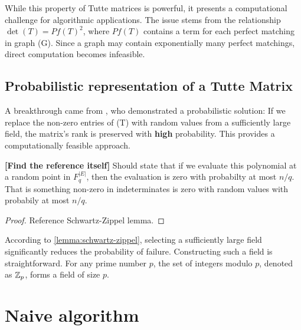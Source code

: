 While this property of Tutte matrices is powerful, it presents a computational challenge for algorithmic applications. 
The issue stems from the relationship \(\det(T) = Pf(T)^2\), where \(Pf(T)\) contains a term for each perfect matching in graph (G). 
Since a graph may contain exponentially many perfect matchings, direct computation becomes infeasible.

\subsection{Probabilistic representation of a Tutte Matrix}
A breakthrough came from \cite{Lovasz:Random}, who demonstrated a probabilistic solution: If we replace the non-zero entries of (T) with random values from a sufficiently large field, the matrix's rank is preserved with \textbf{high} probability. 
This provides a computationally feasible approach.

\begin{lemma}
\label{lemma:schwartz-zippel}
    \textbf{[Find the reference itself]}
    Should state that if we evaluate this polynomial at a random point in \(F^{|E|}_q\), then the evaluation is zero with probabilty at most \(n/q\).
    That is something non-zero in indeterminates is zero with random values with probabily at most \(n/q\).
\end{lemma}

\begin{proof}
    Reference Schwartz-Zippel lemma.
\end{proof}

According to \cref{lemma:schwartz-zippel}, selecting a sufficiently large field significantly reduces the probability of failure.
Constructing such a field is straightforward. 
For any prime number \(p\), the set of integers modulo \(p\), denoted as \(\mathbb{Z}_{p}\), forms a field of size \(p\).


\section{Naive algorithm}

